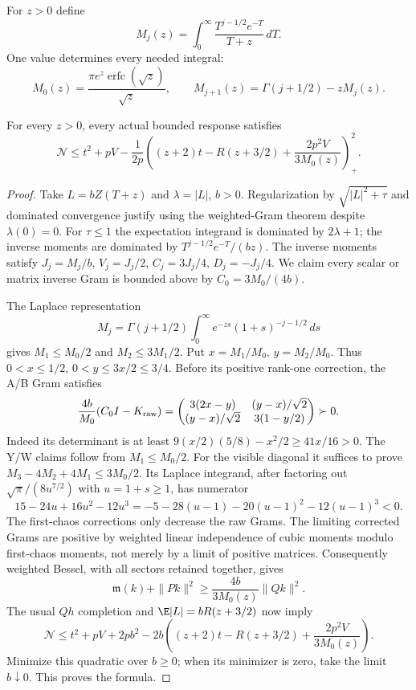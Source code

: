 For $z>0$ define
\[
 M_j(z)=\int_0^\infty\frac{T^{j-1/2}e^{-T}}{T+z}\,dT.
\]
One value determines every needed integral:
\[
 M_0(z)=\frac{\pi e^z\operatorname{erfc}(\sqrt z)}{\sqrt z},
 \qquad M_{j+1}(z)=\Gamma(j+1/2)-zM_j(z).
\]
\begin{theorem}
For every $z>0$, every actual bounded response satisfies
\[
 \boxed{\quad
 \mathcal N\le t^2+pV-\frac1{2p}
 \left((z+2)t-R(z+3/2)+\frac{2p^2V}{3M_0(z)}\right)_+^2.
 \quad}
\]
\end{theorem}
\begin{proof}
Take $L=bZ(T+z)$ and $\lambda=|L|$, $b>0$.
Regularization by $\sqrt{|L|^2+\tau}$ and dominated convergence justify
using the weighted-Gram theorem despite $\lambda(0)=0$.
For $\tau\le1$ the expectation integrand is dominated by $2\lambda+1$;
the inverse moments are dominated by $T^{j-1/2}e^{-T}/(bz)$.
The inverse moments satisfy
$J_j=M_j/b$, $V_j=J_j/2$, $C_j=3J_j/4$, $D_j=-J_j/4$.
We claim every scalar or matrix inverse Gram is bounded above by
$C_0=3M_0/(4b)$.

The Laplace representation
\[
 M_j=\Gamma(j+1/2)\int_0^\infty e^{-zs}(1+s)^{-j-1/2}\,ds
\]
gives $M_1\le M_0/2$ and $M_2\le3M_1/2$.
Put $x=M_1/M_0$, $y=M_2/M_0$. Thus $0<x\le1/2$,
$0<y\le3x/2\le3/4$. Before its positive rank-one correction, the
A/B Gram satisfies
\[
 \frac{4b}{M_0}(C_0I-K_{\rm raw})=
 \begin{pmatrix}3(2x-y)&(y-x)/\sqrt2\\
 (y-x)/\sqrt2&3(1-y/2)\end{pmatrix}\succ0.
\]
Indeed its determinant is at least
$9(x/2)(5/8)-x^2/2\ge41x/16>0$.
The Y/W claims follow from $M_1\le M_0/2$.
For the visible diagonal it suffices to prove
$M_3-4M_2+4M_1\le3M_0/2$. Its Laplace integrand, after factoring out
$\sqrt\pi/(8u^{7/2})$ with $u=1+s\ge1$, has numerator
\[
 15-24u+16u^2-12u^3
 =-5-28(u-1)-20(u-1)^2-12(u-1)^3<0.
\]
The first-chaos corrections only decrease the raw Grams.
The limiting corrected Grams are positive by weighted linear independence
of cubic moments modulo first-chaos moments, not merely by a limit of
positive matrices.
Consequently weighted Bessel, with all sectors retained together, gives
\[
 \mathfrak m(k)+\|Pk\|^2\ge\frac{4b}{3M_0(z)}\|Qk\|^2.
\]
The usual $Qh$ completion and $\E|L|=bR(z+3/2)$ now imply
\[
 \mathcal N\le t^2+pV+2pb^2
 -2b\left((z+2)t-R(z+3/2)+\frac{2p^2V}{3M_0(z)}\right).
\]
Minimize this quadratic over $b\ge0$; when its minimizer is zero,
take the limit $b\downarrow0$. This proves the formula.
\end{proof}

